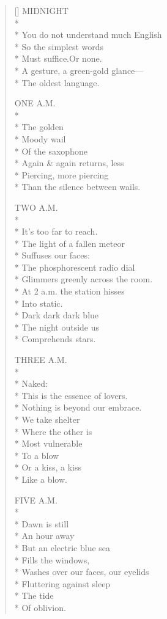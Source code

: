 \label{ch:night_early}
\settowidth{\versewidth}{Washes over our faces, our eyelids}
\begin{verse}[\versewidth]
MIDNIGHT\\*
~\\*
You do not understand much English\\*
So the simplest words\\*
Must suffice.\qquad Or none.\\*
A gesture, a green-gold glance---\\*
The oldest language.

ONE A.M.\\*
~\\*
The golden\\*
Moody wail\\*
Of the saxophone\\*
Again \& again returns, less\\*
Piercing, more piercing\\*
Than the silence between wails.

TWO A.M.\\*
~\\*
It's too far to reach.\\*
The light of a fallen meteor\\*
Suffuses our faces:\\*
The phosphorescent radio dial\\*
Glimmers greenly across the room.\\*
At 2 a.m. the station hisses\\*
Into static.\\*
Dark dark dark blue\\*
The night outside us\\*
Comprehends stars.

THREE A.M.\\*
~\\*
Naked:\\*
This is the essence of lovers.\\*
Nothing is beyond our embrace.\\*
We take shelter\\*
Where the other is\\*
Most vulnerable\\*
To a blow\\*
Or a kiss, a kiss\\*
Like a blow.

FIVE A.M.\\*
~\\*
Dawn is still\\*
An hour away\\*
But an electric blue sea\\*
Fills the windows,\\*
Washes over our faces, our eyelids\\*
Fluttering against sleep\\*
The tide\\*
Of oblivion.


\end{verse}
